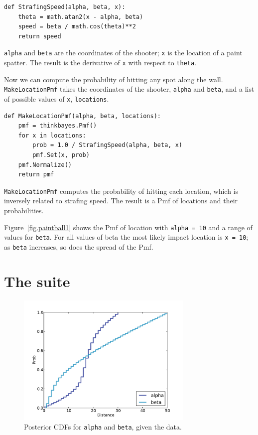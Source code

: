 \documentclass[12pt]{book}
\begin{document}
\begin{verbatim}
def StrafingSpeed(alpha, beta, x):
    theta = math.atan2(x - alpha, beta)
    speed = beta / math.cos(theta)**2
    return speed
\end{verbatim}

{\tt alpha} and {\tt beta} are the coordinates of the shooter;
{\tt x} is the location of a paint spatter.  The result is
the derivative of {\tt x} with respect to {\tt theta}.

Now we can compute the probability of hitting any spot along
the wall.  {\tt MakeLocationPmf} takes the coordinates of
the shooter, {\tt alpha} and {\tt beta}, and a list of possible
values of {\tt x}, {\tt locations}.

\begin{verbatim}
def MakeLocationPmf(alpha, beta, locations):
    pmf = thinkbayes.Pmf()
    for x in locations:
        prob = 1.0 / StrafingSpeed(alpha, beta, x)
        pmf.Set(x, prob)
    pmf.Normalize()
    return pmf
\end{verbatim}

{\tt MakeLocationPmf} computes the probability of hitting
each location, which is inversely related to
strafing speed.  The result is a Pmf of locations and their
probabilities.

Figure~\ref{fig.paintball1} shows the Pmf of location with {\tt alpha
  = 10} and a range of values for {\tt beta}.  For all values of beta
the most likely impact location is {\tt x = 10}; as {\tt beta}
increases, so does the spread of the Pmf.


\section{The suite}

\begin{figure}
\centerline{\includegraphics[height=2.5in]{figs/paintball2.pdf}}
\caption{Posterior CDFs for {\tt alpha} and {\tt beta}, given the data.}
\label{fig.paintball2}
\end{figure}
\end{document}
